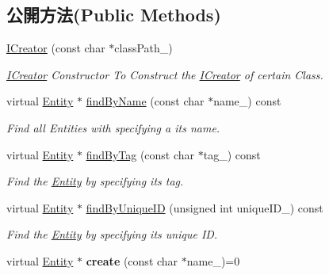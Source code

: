 \subsection*{公開方法(Public Methods)}
\begin{DoxyCompactItemize}
\item 
\hyperlink{class_magnum_1_1_entity_1_1_i_creator_a99e69c3d049b03f808bab699f0dc8e00}{I\+Creator} (const char $\ast$class\+Path\+\_\+)
\begin{DoxyCompactList}\small\item\em \hyperlink{class_magnum_1_1_entity_1_1_i_creator}{I\+Creator} Constructor To Construct the \hyperlink{class_magnum_1_1_entity_1_1_i_creator}{I\+Creator} of certain Class. \end{DoxyCompactList}\item 
virtual \hyperlink{class_magnum_1_1_entity}{Entity} $\ast$ \hyperlink{class_magnum_1_1_entity_1_1_i_creator_addcb07d3da7cb704c89b0ce44db2d70e}{find\+By\+Name} (const char $\ast$name\+\_\+) const 
\begin{DoxyCompactList}\small\item\em Find all Entities with specifying a its name. \end{DoxyCompactList}\item 
virtual \hyperlink{class_magnum_1_1_entity}{Entity} $\ast$ \hyperlink{class_magnum_1_1_entity_1_1_i_creator_a1dcb68d43e234a9bd61eeea43fd60787}{find\+By\+Tag} (const char $\ast$tag\+\_\+) const 
\begin{DoxyCompactList}\small\item\em Find the \hyperlink{class_magnum_1_1_entity}{Entity} by specifying its tag. \end{DoxyCompactList}\item 
virtual \hyperlink{class_magnum_1_1_entity}{Entity} $\ast$ \hyperlink{class_magnum_1_1_entity_1_1_i_creator_ae454803a24c9fd3376a907709ef87a6d}{find\+By\+Unique\+ID} (unsigned int unique\+I\+D\+\_\+) const 
\begin{DoxyCompactList}\small\item\em Find the \hyperlink{class_magnum_1_1_entity}{Entity} by specifying its unique ID. \end{DoxyCompactList}\item 
virtual \hyperlink{class_magnum_1_1_entity}{Entity} $\ast$ {\bfseries create} (const char $\ast$name\+\_\+)=0\hypertarget{class_magnum_1_1_entity_1_1_i_creator_aacf756f6fe3cea544f29874c430b3ff1}{}\label{class_magnum_1_1_entity_1_1_i_creator_aacf756f6fe3cea544f29874c430b3ff1}


\end{DoxyCompactItemize}
